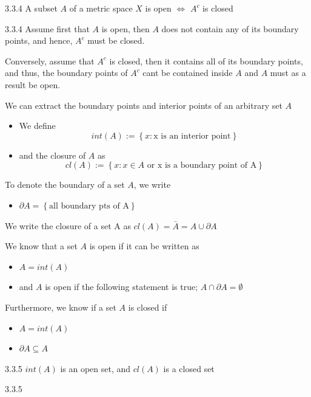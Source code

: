 \documentclass[a4paper,norsk]{article}
\begin{document}
\begin{propositionbox}{3.3.4}{}
A subset $ A $ of a metric space $ X $ is open $ \iff $ $ A^c $ is closed

\begin{proofbox}{3.3.4}{}
  Assume first that $ A $ is open, then $ A $ does not contain any of its boundary points, and hence, $ A^c $ must be closed. 
  \vspace{0.5cm}

  Conversely, assume that $ A^c $ is closed, then it contains all of its boundary points, and thus, the boundary points of $ A^c $ cant be contained inside $ A $ and $ A $ must as a result be open.
\end{proofbox}
\end{propositionbox}


We can extract the boundary points and interior points of an arbitrary set $ A $ 

\begin{itemize}
  \item We define 
  \[
      int(A) := \left\{ x : \text{x is an interior point} \right\} 
  \]
  \item and the closure of $ A $ as
  \[
      cl(A) := \left\{ x : x \in A \text{ or x is a boundary point of A} \right\} 
  \]
\end{itemize}

To denote the boundary of a set $ A $, we write
\begin{itemize}
  \item $ \partial A = \left\{ \text{all boundary pts of A} \right\}  $
\end{itemize}

We write the closure of a set A as 
$ cl(A) = \bar{A} = A \cup \partial A $ 

We know that a set $ A $ is open if it can be written as
\begin{itemize}
  \item $ A = int(A) $ 
  \item and $ A $ is open if the following statement is true; $ A \cap \partial A = \emptyset $ 
\end{itemize}

Furthermore, we know if a set $ A $ is closed if 
\begin{itemize}
  \item $ A = int(A) $ 
  \item $ \partial A \subseteq A $ 
\end{itemize} 

\begin{propositionbox}{3.3.5}{}
$ int(A) $ is an open set, and $ cl(A) $ is a closed set


\begin{proofbox}{3.3.5}{}
  
\end{proofbox}
\end{propositionbox}
\end{document}
